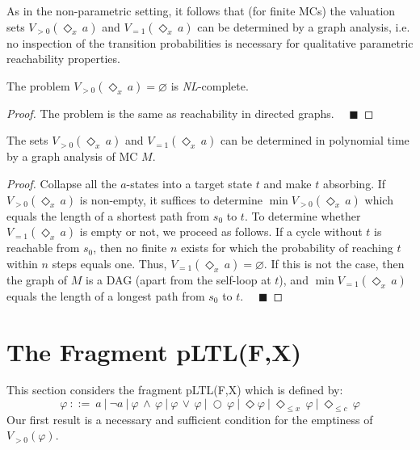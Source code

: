 \documentclass{llncs}
\newcommand{\where}{\ | \ }
\newcommand{\Next}{\bigcirc \, }
\newcommand{\X}{\Next}
\renewcommand{\leq}{\leqslant}
\renewcommand{\emptyset}{\varnothing}
\newcommand{\de}{\Diamond}
\begin{document}
As in the non-parametric setting, it follows that (for finite MCs) the valuation sets $V_{>0}(\de_{x} \, a)$ and $V_{=1}(\de_{x} \, a)$ can be determined by a graph analysis, i.e. no inspection of the transition probabilities is necessary for qualitative parametric reachability properties.
\begin{proposition}
 The problem $V_{>0}(\de_x \, a)=\emptyset$ is \emph{NL}-complete.
\end{proposition}
\begin{proof}
 The problem is the same as reachability in directed graphs. \hfill $\quad\blacksquare$ 
\end{proof}
\begin{proposition}
The sets $V_{>0}(\de_{x} \, a)$ and $V_{=1}(\de_{x} \, a)$ can be determined in polynomial time by a graph analysis of MC $M$.
\end{proposition}
\begin{proof}
Collapse all the $a$-states into a target state $t$ and make $t$ absorbing.
If $V_{>0}(\de_{x} \, a)$ is non-empty, it suffices to determine $\min V_{>0}(\de_{x} \, a)$ which equals the length of a shortest path from $s_0$ to $t$.
To determine whether $V_{=1}(\de_{x} \, a)$ is empty or not, we proceed as follows.
If a cycle without $t$ is reachable from $s_0$, then no finite $n$ exists for which the probability of reaching $t$ within $n$ steps equals one. 
Thus, $V_{=1}(\de_x \, a) = \emptyset$.
If this is not the case, then the graph of $M$ is a DAG (apart from the self-loop at $t$), and $\min V_{=1}(\de_x \, a)$ equals the length of a 
longest path from $s_0$ to $t$. \hfill $\quad\blacksquare$
\end{proof}


\section{The Fragment pLTL(F,X)}
\label{sec:pltlfx}

This section considers the fragment pLTL(F,X) which is defined by:
$$
\varphi \ ::= \ a \where \neg a \where \varphi \, \wedge \, \varphi \where \varphi \, \vee \, \varphi \where \X\! \varphi \where \de \varphi \where \de_{\leq x} \, \varphi \where \de_{\leq c} \, \varphi
$$ 
Our first result is a necessary and sufficient condition for the emptiness of $V_{{>} 0}(\varphi)$.
\end{document}
